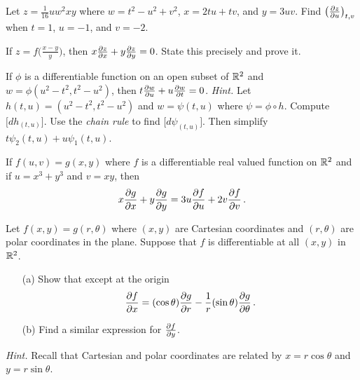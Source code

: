 \begin{prob}  Let $z = \frac1{16}uw^2xy$ where $w = t^2 - u^2 + v^2$, $x = 2tu + tv$, and $y = 3uv$.
Find $\left(\frac{\partial z}{\partial u}\right)_{t,v}$ when $t = 1$, $u = -1$, and $v = -2$.
\end{prob}

\begin{prob}  If $z = f\biggl(\frac{x-y}y\biggr)$, then $x \frac{\partial z}{\partial x} + y \frac{\partial z}{\partial y} = 0$.  State this
precisely and prove it.
\end{prob}

\begin{prob}  If $\phi$ is a differentiable function on an open subset of $\mathbb{R}^2$ and $w =
\phi(u^2 - t^2, t^2 - u^2)$, then $t \frac{\partial w}{\partial u} + u \frac{\partial w}{\partial t} = 0$.  \emph{Hint.}  Let $h(t,u) = (u^2
- t^2, t^2 - u^2)$ and $w = \psi(t,u)$ where $\psi = \phi \circ h$.  Compute
$\bigl[dh_{(t,u)}\bigr]$.  Use the \emph{chain rule} to find $\bigl[d\psi_{(t, u)}\bigr]$.
Then simplify $t \psi_2(t,u) + u \psi_1(t,u)$.
\end{prob}

\begin{prob}  If $f(u,v) = g(x,y)$ where $f$ is a differentiable real valued function on $\mathbb{R}^2$
and if $u = x^3 + y^3$ and $v = xy$, then
  \[ x \frac{\partial g}{\partial x} + y \frac{\partial g}{\partial y} = 3u \frac{\partial f}{\partial u} + 2v \frac{\partial f}{\partial v}\,. \]
\end{prob}

\begin{prob}  Let $f(x,y) = g(r,\theta)$ where $(x,y)$ are Cartesian coordinates and $(r,\theta)$
are polar coordinates in the plane.  Suppose that $f$ is differentiable at all $(x,y)$
in~$\mathbb{R}^2$.
 \begin{enumerate}
  \item[(a)]  Show that except at the origin
      \[ \frac{\partial f}{\partial x}  = (\cos \theta)\frac{\partial g}{\partial r} - \frac1r(\sin \theta)\frac{\partial g}{\partial\theta}\,. \]
  \item[(b)] Find a similar expression for $\frac{\partial f}{\partial y}$.
 \end{enumerate}
\emph{Hint.}  Recall that Cartesian and polar coordinates are related by $x = r\cos\theta$ and
$y = r\sin\theta$.
\end{prob}


